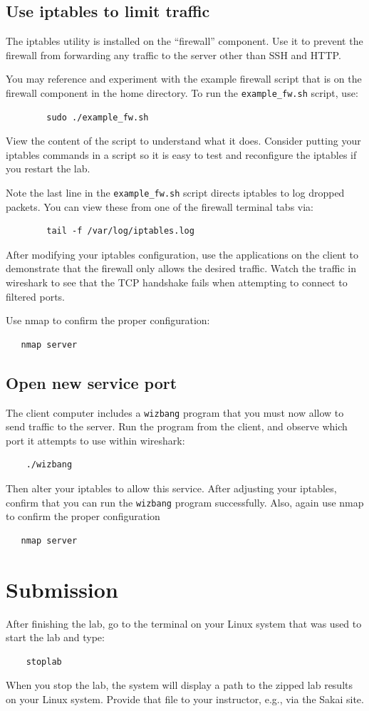 \subsection{Use iptables to limit traffic}
The iptables utility is installed on the ``firewall'' component.
Use it to prevent the firewall from forwarding any traffic
to the server other than SSH and HTTP.

You may reference and experiment with the example firewall script that
is on the firewall component in the home directory.  
To run the {\tt example\_fw.sh} script, use:
\begin{verbatim}
        sudo ./example_fw.sh
\end{verbatim}
View the content of the script to understand what it does.
Consider putting your iptables commands in a script so it is easy
to test and reconfigure the iptables if you restart the lab.

Note the last line in the {\tt example\_fw.sh} script directs iptables
to log dropped packets.  You can view these from one of the firewall terminal
tabs via:
\begin{verbatim}
        tail -f /var/log/iptables.log
\end{verbatim}

After modifying your iptables configuration, use the applications on the client to
demonstrate that the firewall only allows the desired traffic.
Watch the traffic in wireshark to see that the TCP handshake fails
when attempting to connect to filtered ports.

Use nmap to confirm the proper configuration:
\begin{verbatim}
   nmap server
\end{verbatim}


\subsection{Open new service port}
The client computer includes a {\tt wizbang} program that you must now allow to send
traffic to the server.  Run the program from the client, and observe which port it
attempts to use within wireshark:
\begin{verbatim}
    ./wizbang
\end{verbatim}
\noindent Then alter your iptables to allow this service.  After adjusting your iptables, 
confirm that you can run the {\tt wizbang} program successfully.
Also, again use nmap to confirm the proper configuration
\begin{verbatim}
   nmap server
\end{verbatim}

\section{Submission}
After finishing the lab, go to the terminal on your Linux system that was used to start the lab and type:
\begin{verbatim}
    stoplab 
\end{verbatim}
When you stop the lab, the system will display a path to the zipped lab results on your Linux system.  Provide that file to 
your instructor, e.g., via the Sakai site.

\copyrightnotice


